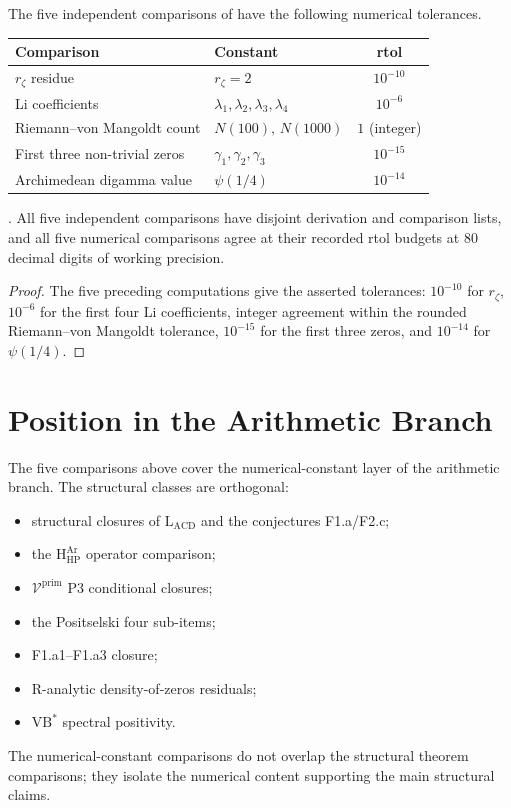 The five independent comparisons of
 have the following numerical
tolerances.

\begin{center}
\small
\begin{tabular}{l|l|c}
Comparison & Constant & rtol \\
\hline
\(r_\zeta\) residue &
\(r_{\zeta}=2\) & \(10^{-10}\) \\
Li coefficients &
\(\lambda_{1},\lambda_{2},\lambda_{3},\lambda_{4}\) & \(10^{-6}\) \\
Riemann--von Mangoldt count &
\(N(100),\,N(1000)\) & \(1\) (integer) \\
First three non-trivial zeros &
\(\gamma_{1},\gamma_{2},\gamma_{3}\) & \(10^{-15}\) \\
Archimedean digamma value &
\(\psi(1/4)\) & \(10^{-14}\) \\
\end{tabular}
\end{center}

\begin{theorem}
\label{v4-arith:w6-h:thm:realization-table}
\ClaimStatusProvedHere. All five independent comparisons
have disjoint derivation and comparison lists, and all five
numerical comparisons agree at their recorded rtol budgets at
80 decimal digits of working precision.
\end{theorem}

\begin{proof}
The five preceding computations give the asserted tolerances:
\(10^{-10}\) for \(r_{\zeta}\), \(10^{-6}\) for the first four
Li coefficients, integer agreement within the rounded
Riemann--von Mangoldt tolerance, \(10^{-15}\) for the first three
zeros, and \(10^{-14}\) for \(\psi(1/4)\).
\end{proof}

\section{Position in the Arithmetic Branch}
\label{v4-arith:w6-h:placement}

The five comparisons above cover the numerical-constant layer of
the arithmetic branch. The structural classes are orthogonal:
\begin{itemize}
\item structural closures of \(\mathrm{L}_{\mathrm{ACD}}\) and the
conjectures F1.a/F2.c;
\item the \(\mathrm{H}_{\mathrm{HP}}^{\mathrm{Ar}}\) operator comparison;
\item \(\mathcal{V}^{\mathrm{prim}}\) P3 conditional closures;
\item the Positselski four sub-items;
\item F1.a1--F1.a3 closure;
\item R-analytic density-of-zeros residuals;
\item \(\mathrm{VB}^{\ast}\) spectral positivity.
\end{itemize}
The numerical-constant comparisons do not overlap the structural
theorem comparisons; they isolate the numerical content supporting
the main structural claims.

